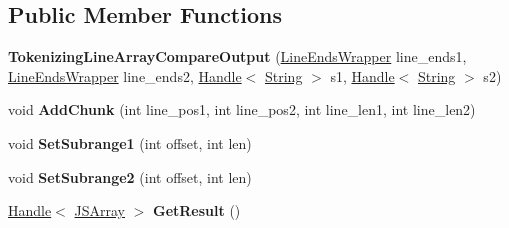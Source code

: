 \subsection*{Public Member Functions}
\begin{DoxyCompactItemize}
\item 
{\bfseries Tokenizing\+Line\+Array\+Compare\+Output} (\hyperlink{classv8_1_1internal_1_1_line_ends_wrapper}{Line\+Ends\+Wrapper} line\+\_\+ends1, \hyperlink{classv8_1_1internal_1_1_line_ends_wrapper}{Line\+Ends\+Wrapper} line\+\_\+ends2, \hyperlink{classv8_1_1internal_1_1_handle}{Handle}$<$ \hyperlink{classv8_1_1internal_1_1_string}{String} $>$ s1, \hyperlink{classv8_1_1internal_1_1_handle}{Handle}$<$ \hyperlink{classv8_1_1internal_1_1_string}{String} $>$ s2)\hypertarget{classv8_1_1internal_1_1_tokenizing_line_array_compare_output_a0ba6126f42b89719f5a984a2126f34a4}{}\label{classv8_1_1internal_1_1_tokenizing_line_array_compare_output_a0ba6126f42b89719f5a984a2126f34a4}

\item 
void {\bfseries Add\+Chunk} (int line\+\_\+pos1, int line\+\_\+pos2, int line\+\_\+len1, int line\+\_\+len2)\hypertarget{classv8_1_1internal_1_1_tokenizing_line_array_compare_output_a1bad0d39f46413fdbff46933567cddff}{}\label{classv8_1_1internal_1_1_tokenizing_line_array_compare_output_a1bad0d39f46413fdbff46933567cddff}

\item 
void {\bfseries Set\+Subrange1} (int offset, int len)\hypertarget{classv8_1_1internal_1_1_tokenizing_line_array_compare_output_a6f547f4407c739e284bc2777653e1f73}{}\label{classv8_1_1internal_1_1_tokenizing_line_array_compare_output_a6f547f4407c739e284bc2777653e1f73}

\item 
void {\bfseries Set\+Subrange2} (int offset, int len)\hypertarget{classv8_1_1internal_1_1_tokenizing_line_array_compare_output_ad95c4664f6b21b334bc46751118ef8d8}{}\label{classv8_1_1internal_1_1_tokenizing_line_array_compare_output_ad95c4664f6b21b334bc46751118ef8d8}

\item 
\hyperlink{classv8_1_1internal_1_1_handle}{Handle}$<$ \hyperlink{classv8_1_1internal_1_1_j_s_array}{J\+S\+Array} $>$ {\bfseries Get\+Result} ()\hypertarget{classv8_1_1internal_1_1_tokenizing_line_array_compare_output_aaea7e407c1e0de9e799cd569819b67f5}{}\label{classv8_1_1internal_1_1_tokenizing_line_array_compare_output_aaea7e407c1e0de9e799cd569819b67f5}

\end{DoxyCompactItemize}
